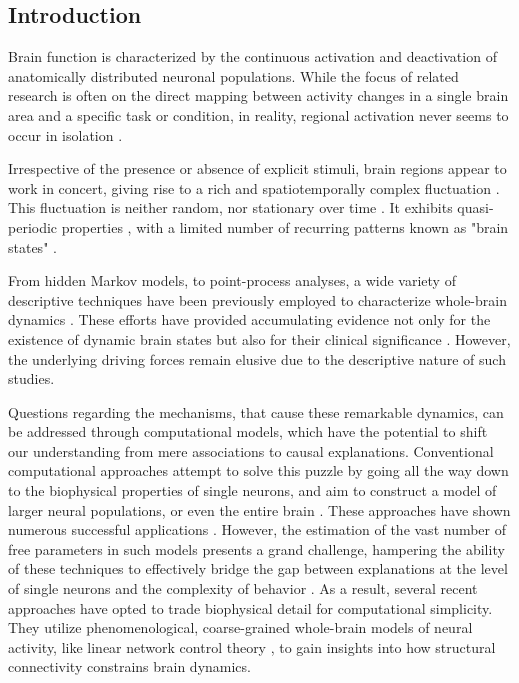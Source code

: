 \documentclass{article}
\begin{document}
\subsection{Introduction}\label{Introduction}

Brain function is characterized by the continuous activation and deactivation of anatomically distributed neuronal
populations.
While the focus of related research is often on the direct mapping between activity changes in a single brain
area and a specific task or condition, in reality, regional activation never seems to occur in isolation
\citep{bassett2017network}.

Irrespective of the presence or absence of explicit stimuli, brain regions appear to work in concert, giving rise to a
rich and spatiotemporally complex fluctuation \citep{gutierrez2019infraslow}.
This fluctuation is neither random, nor stationary over time \citep{liu2013time, zalesky2014time}.
It exhibits quasi-periodic properties \citep{thompson2014quasi}, with a limited number of
recurring patterns known as "brain states" \citep{greene2023everyone, vidaurre2017brain, liu2013time, richiardi2011decoding}.

From hidden Markov models, to point-process analyses, a wide variety of descriptive techniques have been previously
employed to characterize whole-brain dynamics \citep{smith2012temporally, vidaurre2017brain, liu2013time, chen2018human}.
These efforts have provided accumulating evidence not only for the existence of dynamic brain states but also for their clinical
significance \citep{hutchison2013dynamic, barttfeld2015signature, meer2020movie}.
However, the underlying driving forces remain elusive due to the descriptive nature of such studies.

Questions regarding the mechanisms, that cause these remarkable dynamics, can be addressed through computational models, which have the potential to shift our understanding from mere associations to causal explanations.
Conventional computational approaches attempt to solve this puzzle by going all the way down to the biophysical properties of single neurons, and aim to construct a model of larger neural populations, or even the entire brain
\citep{breakspear2017dynamic}.
These approaches have shown numerous successful applications \citep{murray2018biophysical, kriegeskorte2018cognitive, heinz2019towards}.
However, the estimation of the vast number of free parameters in such models presents a grand challenge, hampering the ability of these techniques to effectively bridge the gap between explanations at the level of single neurons and the complexity of behavior \citep{breakspear2017dynamic}. As a result, several recent approaches have opted to trade biophysical detail for computational simplicity. They utilize phenomenological, coarse-grained whole-brain models \citep{schiff1994controlling, papadopoulos2017development} of neural activity, like linear network control theory  \citep{luppi2023transitions, chiem2021structure, gu2017optimal, scheid2021time, gu2015controllability}, to gain insights into how structural connectivity constrains brain dynamics.
\end{document}
